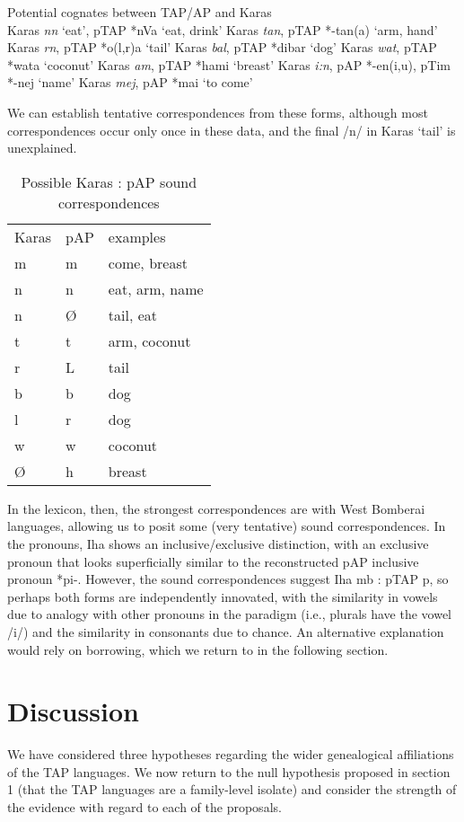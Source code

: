 \ea%
  Potential cognates between TAP/AP and Karas \\
  \ea Karas \textit{n}\textit{{\textsci}}\textit{n} `eat', pTAP *nVa `eat, drink'
  \ex Karas \textit{tan}, pTAP *-tan(a) `arm, hand'
  \ex Karas \textit{{\textopeno}}\textit{r}\textit{{\textupsilon}}\textit{n}, pTAP *o(l,r)a `tail'
  \ex Karas \textit{bal}, pTAP *dibar `dog'
  \ex Karas \textit{wat}, pTAP *wata `coconut'
  \ex Karas \textit{am}, pTAP *hami `breast'
  \ex Karas \textit{i:n}, pAP *-en(i,u), pTim *-nej `name'
  \ex Karas \textit{mej}, pAP *mai `to come'
  \z
\z

We can establish tentative correspondences from these forms, although most correspondences occur only once in these data, and the final /n/ in Karas `tail' is unexplained.



\begin{table}\centering


\begin{tabular}{lll}
Karas&pAP&examples\\
m&m&come, breast\\
n&n&eat, arm, name \\
n&{\O}&tail, eat\\
t&t&arm, coconut\\
r&L&tail\\
b&b&dog\\
l&r&dog\\
w&w&coconut\\
{\O}&h&breast\\

\end{tabular}

\caption{Possible Karas : pAP sound correspondences}\end{table}
In the lexicon, then, the strongest correspondences are with West Bomberai languages, allowing us to posit some (very tentative) sound correspondences. In the pronouns, Iha shows an inclusive/exclusive distinction, with an exclusive pronoun that looks superficially similar to the reconstructed pAP inclusive pronoun *pi-. However, the sound correspondences suggest Iha mb : pTAP p, so perhaps both forms are independently innovated, with the similarity in vowels due to analogy with other pronouns in the paradigm (i.e., plurals have the vowel /i/) and the similarity in consonants due to chance. An alternative explanation would rely on borrowing, which we return to in the following section.

\section{Discussion}
We have considered three hypotheses regarding the wider genealogical affiliations of the TAP languages. We now return to the null hypothesis proposed in section 1 (that the TAP languages are a family-level isolate) and consider the strength of the evidence with regard to each of the proposals.

